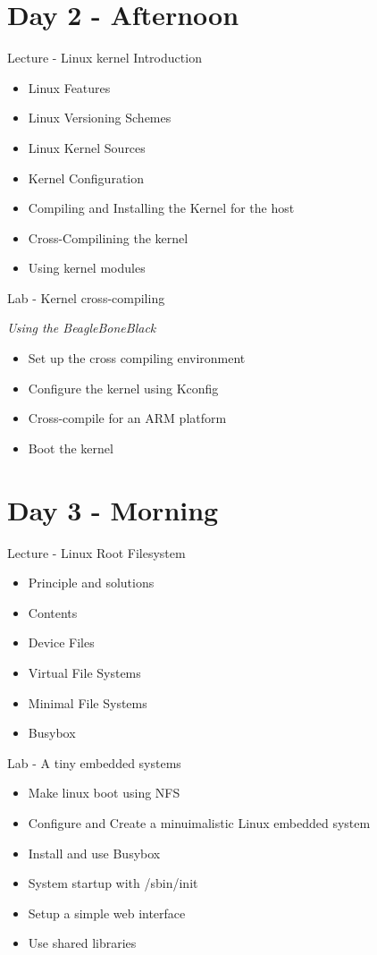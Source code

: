 \documentclass[a4paper,12pt,obeyspaces,spaces,hyphens]{article}
\begin{document}
\section{Day 2 - Afternoon}
\feagendatwocolumn
{Lecture - Linux kernel Introduction}
{
  \begin{itemize}
  \item Linux Features
  \item Linux Versioning Schemes
  \item Linux Kernel Sources
  \item Kernel Configuration
  \item Compiling and Installing the Kernel for the host
  \item Cross-Compilining the kernel
  \item Using kernel modules
  \end{itemize}
}
{Lab - Kernel cross-compiling}
{
  {\em Using the BeagleBoneBlack}
  \begin{itemize}
  \item Set up the cross compiling environment
  \item Configure the kernel using Kconfig
  \item Cross-compile for an ARM platform
  \item Boot the kernel
  \end{itemize}
}

\clearpage
\section{Day 3 - Morning}

\feagendatwocolumn
{Lecture - Linux Root Filesystem}
{
  \begin{itemize}
  \item Principle and solutions
  \item Contents
  \item Device Files
  \item Virtual File Systems
  \item Minimal File Systems
  \item Busybox
  \end{itemize}
}
{Lab - A tiny embedded systems} 
{
  \begin{itemize}
  \item Make linux boot using NFS
  \item Configure and Create a minuimalistic Linux embedded system
  \item Install and use Busybox
  \item System startup with /sbin/init
  \item Setup a simple web interface
  \item Use shared libraries
  \end{itemize}
}
\end{document}
